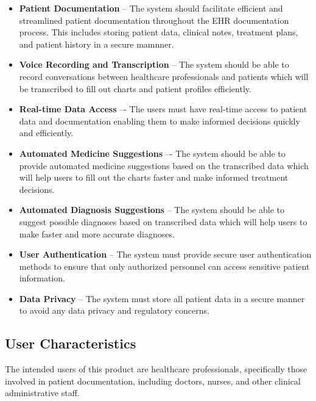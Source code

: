 \documentclass[12pt]{article}
\begin{document}
\begin{itemize}
  \item \textbf{Patient Documentation} -- The system should facilitate efficient and streamlined patient documentation throughout the EHR documentation process. This includes storing patient data, clinical notes, treatment plans, and patient history in a secure mamnner.
  
  \item \textbf{Voice Recording and Transcription} -- The system should be able to record conversations between healthcare professionals and patients which will be transcribed to fill out charts and patient profiles efficiently.
  
  \item \textbf{Real-time Data Access} –- The users must have real-time access to patient data and documentation enabling them to make informed decisions quickly and efficiently.
  
  \item \textbf{Automated Medicine Suggestions} –- The system should be able to provide automated medicine suggestions based on the transcribed data which will help users to fill out the charts faster and make informed treatment decisions.
  
  \item \textbf{Automated Diagnosis Suggestions} -- The system should be able to suggest possible diagnoses based on transcribed data which will help users to make faster and more accurate diagnoses.
  
  \item \textbf{User Authentication} -- The system must provide secure user authentication methods to ensure that only authorized personnel can access sensitive patient information.
  
  \item \textbf{Data Privacy} -- The system must store all patient data in a secure manner to avoid any data privacy and regulatory concerns.
  
\end{itemize}


\subsection{User Characteristics} \label{SecUserCharacteristics}

The intended users of this product are healthcare professionals, specifically those involved in patient documentation, including doctors, nurses, and other clinical administrative staff. 
\end{document}
